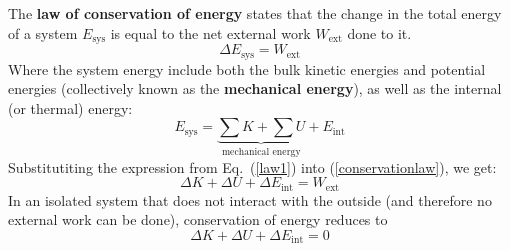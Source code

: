 \documentclass[11pt]{article}
\begin{document}
The \textbf{law of conservation of energy} states that the change in the total
energy of a system $E_\text{sys}$ is equal to the net external work
$W_\text{ext}$ done to it.
\begin{equation}
  \boxed{
    \Delta E_\text{sys}=W_\text{ext}
  }
  \label{conservationlaw}
\end{equation}
Where the system energy include both the bulk kinetic energies and potential
energies (collectively known as the \textbf{mechanical energy}), as well as the
internal (or thermal) energy:
\begin{equation}
  E_\text{sys}=\underbrace{\sum K + \sum U}_\text{mechanical energy}+E_\text{int}
  \label{law1}
\end{equation}
Substitutiting the expression from Eq.~(\ref{law1}) into
(\ref{conservationlaw}), we get:
\begin{equation}
  \boxed{
    \Delta K + \Delta U + \Delta E_\text{int} = W_\text{ext}
  }
\end{equation}
In an isolated system that does not interact with the outside (and therefore
no external work can be done), conservation of energy reduces to
\begin{equation}
  \Delta K + \Delta U + \Delta E_\text{int} = 0
\end{equation}

%  
%

\end{document}
